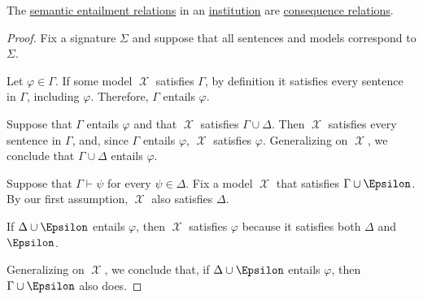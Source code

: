 \begin{proposition}\label{thm:derivability_relations_are_consequence}
  The \hyperref[def:institutional_entailment]{semantic entailment relations} in an \hyperref[def:institution]{institution} are \hyperref[def:consequence_relation]{consequence relations}.
\end{proposition}
\begin{proof}
  Fix a signature \( \Sigma \) and suppose that all sentences and models correspond to \( \Sigma \).

   Let \( \varphi \in \Gamma \). If some model \( \mscrX \) satisfies \( \Gamma \), by definition it satisfies every sentence in \( \Gamma \), including \( \varphi \). Therefore, \( \Gamma \) entails \( \varphi \).

   Suppose that \( \Gamma \) entails \( \varphi \) and that \( \mscrX \) satisfies \( \Gamma \cup \Delta \). Then \( \mscrX \) satisfies every sentence in \( \Gamma \), and, since \( \Gamma \) entails \( \varphi \), \( \mscrX \) satisfies \( \varphi \). Generalizing on \( \mscrX \), we conclude that \( \Gamma \cup \Delta \) entails \( \varphi \).

   Suppose that \( \Gamma \vdash \psi \) for every \( \psi \in \Delta \). Fix a model \( \mscrX \) that satisfies \( \Gamma \cup \Epsilon \). By our first assumption, \( \mscrX \) also satisfies \( \Delta \).

  If \( \Delta \cup \Epsilon \) entails \( \varphi \), then \( \mscrX \) satisfies \( \varphi \) because it satisfies both \( \Delta \) and \( \Epsilon \).

  Generalizing on \( \mscrX \), we conclude that, if \( \Delta \cup \Epsilon \) entails \( \varphi \), then \( \Gamma \cup \Epsilon \) also does.
\end{proof}


